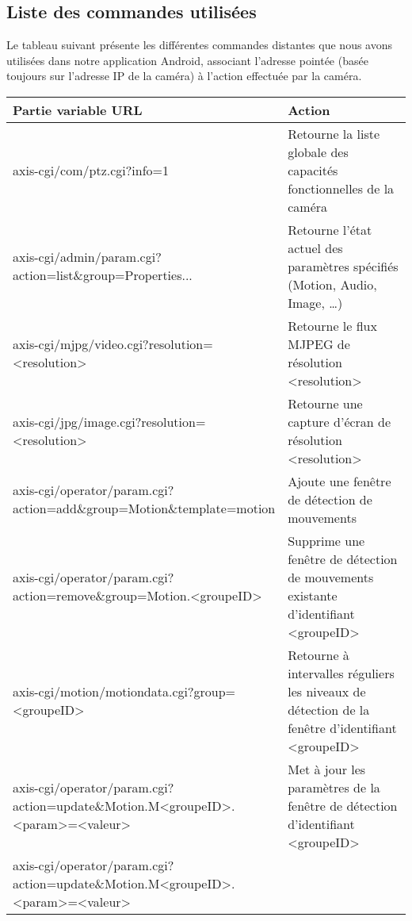 \subsection{Liste des commandes utilisées}
Le tableau suivant présente les différentes commandes distantes que nous avons
utilisées dans notre application Android, associant l'adresse pointée (basée toujours sur l'adresse IP de la caméra) à l'action effectuée par la caméra.
 \begin{table}[H]
\centering
\begin{tabular}{|p{0.6\linewidth}|p{0.4\linewidth}|}
\hline
Partie variable URL & Action\\
\hline
axis-cgi/com/ptz.cgi?info=1 & Retourne la liste globale des capacités fonctionnelles de la caméra\\
\hline
axis-cgi/admin/param.cgi?\newline action=list\&group=Properties... & Retourne l'état
actuel des paramètres spécifiés (Motion, Audio, Image, \dots)\\
\hline
axis-cgi/mjpg/video.cgi?resolution=\textless resolution\textgreater  & Retourne le flux MJPEG de
résolution \textless resolution\textgreater \\
\hline
axis-cgi/jpg/image.cgi?resolution=\textless resolution\textgreater 
& Retourne une capture d'écran de résolution \textless resolution\textgreater \\
\hline
axis-cgi/operator/param.cgi?\newline action=add\&group=Motion\&template=motion & Ajoute une
fenêtre de détection de mouvements\\
\hline
axis-cgi/operator/param.cgi?\newline action=remove\&group=Motion.\textless groupeID\textgreater  & Supprime une
fenêtre de détection de mouvements existante d'identifiant \textless groupeID\textgreater \\
\hline
axis-cgi/motion/motiondata.cgi?\newline group=\textless groupeID\textgreater  & Retourne à intervalles
réguliers les niveaux de détection de la fenêtre d'identifiant \textless groupeID\textgreater \\
\hline
axis-cgi/operator/param.cgi?\newline action=update\&Motion.M\textless groupeID\textgreater .\textless param\textgreater =\textless valeur\textgreater  &
Met à jour les paramètres de la fenêtre de détection d'identifiant \textless groupeID\textgreater \\
\hline
axis-cgi/operator/param.cgi?\newline action=update\&Motion.M\textless groupeID\textgreater .\textless param\textgreater =\textless valeur\textgreater  &

\end{tabular}
\end{table}
